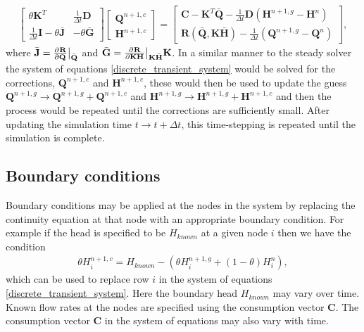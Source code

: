 \begin{align}\label{discrete_transient_system}
\begin{bmatrix}
\theta \mathbf{K}^T & \frac{1}{\Delta t}\mathbf{D} \\
\frac{1}{\Delta t}\mathbf{I}-\theta \bar{\mathbf{J}} & - \theta \bar{\mathbf{G}}
\end{bmatrix} 
\begin{bmatrix}
\mathbf{Q}^{n+1,c} \\ \mathbf{H}^{n+1,c}
\end{bmatrix} = \begin{bmatrix}
\mathbf{C} - \mathbf{K}^T \bar{\mathbf{Q}} - \frac{1}{\Delta t} \mathbf{D} \left( \mathbf{H}^{n+1,g} - \mathbf{H}^{n} \right) \\
\mathbf{R}\left(\bar{\mathbf{Q}}, \mathbf{K} \bar{\mathbf{H}} \right) - \frac{1}{\Delta t} \left(\mathbf{Q}^{n+1,g} - \mathbf{Q}^{n} \right)
\end{bmatrix},
\end{align}
where $\bar{\mathbf{J}} = \frac{\partial^{} \mathbf{R}}{\partial \mathbf{Q}^{}} \big\vert_{\bar{\mathbf{Q}}}$ and $\bar{\mathbf{G}} = \frac{\partial^{} \mathbf{R}}{\partial \mathbf{K} \mathbf{H}^{}} \big\vert_{\mathbf{K} \bar{\mathbf{H}}} \mathbf{K} $. In a similar manner to the steady solver the system of equations \eqref{discrete_transient_system} would be solved for the corrections, $\mathbf{Q}^{n+1,c}$ and $\mathbf{H}^{n+1,c}$, these would then be used to update the guess $\mathbf{Q}^{n+1,g} \rightarrow \mathbf{Q}^{n+1,g} + \mathbf{Q}^{n+1,c} $ and $\mathbf{H}^{n+1,g} \rightarrow \mathbf{H}^{n+1,g} + \mathbf{H}^{n+1,c} $ and then the process would be repeated until the corrections are sufficiently small. After updating the simulation time $t \rightarrow t + \Delta t$, this time-stepping is repeated until the simulation is complete.   

\subsection{Boundary conditions}

Boundary conditions may be applied at the nodes in the system by replacing the continuity equation at that node with an appropriate boundary condition. For example if the head is specified to be $H_{known}$ at a given node $i$ then we have the condition 
\begin{align}
\theta H_i^{n+1,c} = H_{known} - \left( \theta H_i^{n+1,g} + (1-\theta)H_i^n \right),
\end{align} 
which can be used to replace row $i$ in the system of equations \eqref{discrete_transient_system}. Here the boundary head $H_{known}$ may vary over time. Known flow rates at the nodes are specified using the consumption vector $\mathbf{C}$. The consumption vector $\mathbf{C}$ in the system of equations may also vary with time. 

